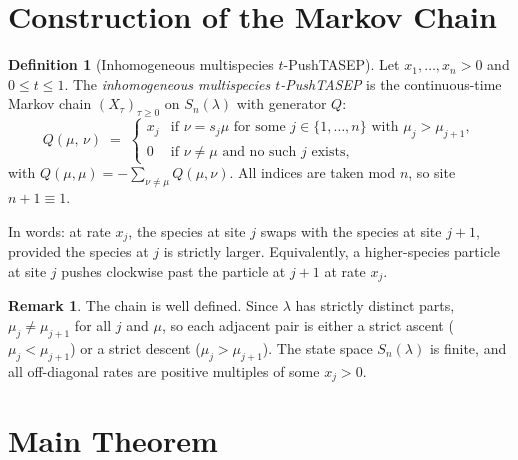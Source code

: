 \documentclass[12pt]{article}
\theoremstyle{definition}
\newtheorem{definition}[theorem]{Definition}
\newtheorem{remark}[theorem]{Remark}
\begin{document}
\section{Construction of the Markov Chain}

\begin{definition}[Inhomogeneous multispecies $t$-PushTASEP]
\label{def:chain}
Let $x_1,\dots,x_n > 0$ and $0 \leq t \leq 1$.  The
\emph{inhomogeneous multispecies $t$-PushTASEP} is the continuous-time
Markov chain $(X_\tau)_{\tau \geq 0}$ on $S_n(\lambda)$ with generator $Q$:
\begin{equation}
  Q(\mu,\,\nu) \;=\;
  \begin{cases}
    x_j & \text{if } \nu = s_j\mu \text{ for some } j \in \{1,\dots,n\}
           \text{ with } \mu_j > \mu_{j+1}, \\[2pt]
    0   & \text{if } \nu \neq \mu \text{ and no such } j \text{ exists,}
  \end{cases}
\label{eq:rates}
\end{equation}
with $Q(\mu,\mu) = -\sum_{\nu \neq \mu} Q(\mu,\nu)$.  All indices are taken
mod $n$, so site $n+1 \equiv 1$.
\end{definition}

In words: at rate $x_j$, the species at site $j$ swaps with the species at
site $j+1$, provided the species at $j$ is strictly larger.  Equivalently,
a higher-species particle at site $j$ pushes clockwise past the particle at
$j+1$ at rate $x_j$.

\begin{remark}\label{rmk:welldefined}
The chain is well defined.  Since $\lambda$ has strictly distinct parts,
$\mu_j \neq \mu_{j+1}$ for all $j$ and $\mu$, so each adjacent pair is
either a strict ascent ($\mu_j < \mu_{j+1}$) or a strict descent
($\mu_j > \mu_{j+1}$).  The state space $S_n(\lambda)$ is finite, and all
off-diagonal rates are positive multiples of some $x_j > 0$.
\end{remark}

\section{Main Theorem}
\end{document}
